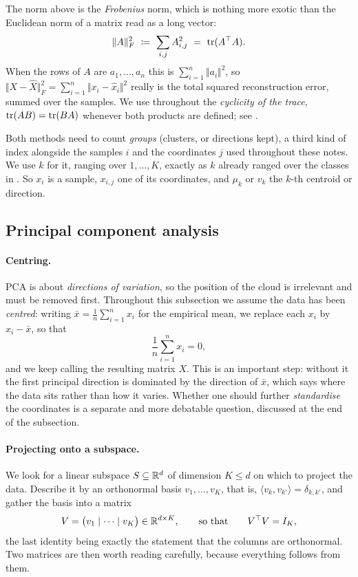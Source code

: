 \begin{remark}
\label{rem:frobenius}
The norm above is the \emph{Frobenius} norm, which is nothing more exotic than the
Euclidean norm of a matrix read as a long vector:
\[
\Vert A \Vert_F^2 \ \coloneqq \ \sum_{i,j} A_{i,j}^2 \ = \ \operatorname{tr}(A^\top A) .
\]
When the rows of $A$ are $a_1, \dots, a_n$ this is $\sum_{i=1}^n \Vert a_i \Vert^2$, so
$\Vert X - \hat X \Vert_F^2 = \sum_{i=1}^n \Vert x_i - \hat x_i \Vert^2$ really is the
total squared reconstruction error, summed over the samples. We use throughout the
\emph{cyclicity of the trace}, $\operatorname{tr}(AB) = \operatorname{tr}(BA)$ whenever both products are defined;
see .
\end{remark}

\begin{remark}
\label{rem:third-index}
Both methods need to count \emph{groups} (clusters, or directions kept), a third kind
of index alongside the samples $i$ and the coordinates $j$ used throughout these notes. We
use $k$ for it, ranging over $1, \dots, K$, exactly as $k$ already ranged over the
classes in . So $x_i$ is a sample, $x_{i,j}$ one of its
coordinates, and $\mu_k$ or $v_k$ the $k$-th centroid or direction.
\end{remark}


\subsection{Principal component analysis}
\label{subsec:pca}

\paragraph{Centring.}
PCA is about \emph{directions of variation}, so the position of the cloud is
irrelevant and must be removed first. Throughout this subsection we assume the data has
been \emph{centred}: writing $\bar x = \tfrac1n \sum_{i=1}^n x_i$ for the empirical
mean, we replace each $x_i$ by $x_i - \bar x$, so that
\[
\frac{1}{n} \sum_{i=1}^n x_i = 0 ,
\]
and we keep calling the resulting matrix $X$. This is an important step: without it
the first principal direction is dominated by the direction of $\bar x$, which says
where the data sits rather than how it varies. Whether one should further
\emph{standardise} the coordinates is a separate and more debatable question, discussed
at the end of the subsection.

\paragraph{Projecting onto a subspace.}
We look for a linear subspace $S \subseteq \mathbb{R}^d$ of dimension $K \leq d$ on which to
project the data. Describe it by an orthonormal basis $v_1, \dots, v_K$, that is,
$\langle v_k, v_{k'} \rangle = \delta_{k,k'}$, and gather the basis into a matrix
\[
V = \big( v_1 \mid \dots \mid v_K \big) \in \mathbb{R}^{d \times K} ,
\qquad \text{so that} \qquad
V^\top V = I_K ,
\]
the last identity being exactly the statement that the columns are orthonormal.
Two matrices are then worth reading carefully, because everything follows from them.

